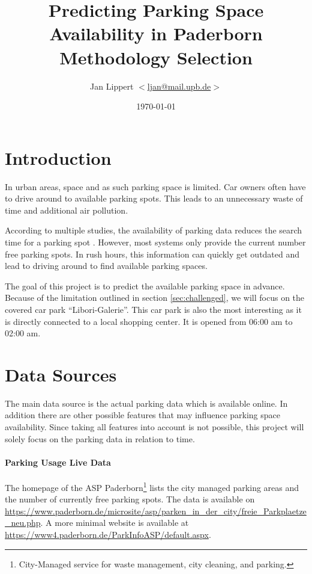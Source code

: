 \documentclass[journal,10pt]{IEEEtran}
\title{Predicting Parking Space Availability in Paderborn\\
Methodology Selection}
\author{Jan Lippert \(<\)\href{mailt:ljan@mail.upb.de}{ljan@mail.upb.de}\(>\)}
\date{\today}
\begin{document}
\maketitle

\section{Introduction}

In urban areas, space and as such parking space is limited. Car owners often have to drive around to available parking spots. This leads to an unnecessary waste of time and additional air pollution. 

According to multiple studies, the availability of parking data reduces the search time for a parking spot \cite{Asakura1994}\cite{Caicedo2010228}. However, most systems only provide the current number free parking spots. In rush hours, this information can quickly get outdated and lead to driving around to find available parking spaces.

The goal of this project is to predict the available parking space in advance. Because of the limitation outlined in section \ref{sec:challenged}, we will focus on the covered car park ``Libori-Galerie''. This car park is also the most interesting as it is directly connected to a local shopping center. It is opened from 06:00 am to 02:00 am.

\section{Data Sources}\label{data sources}
The main data source is the actual parking data which is available online. In addition there are other possible features that may influence parking space availability. Since taking all features into account is not possible, this project will solely focus on the parking data in relation to time. 

\paragraph{Parking Usage Live Data}
The homepage of the ASP Paderborn\footnote{City-Managed service for waste management, city cleaning, and parking.} lists the city managed parking areas and the number of currently free parking spots. 
The data is available on \url{https://www.paderborn.de/microsite/asp/parken_in_der_city/freie_Parkplaetze_neu.php}. A more minimal website is available at \url{https://www4.paderborn.de/ParkInfoASP/default.aspx}. 
\end{document}
